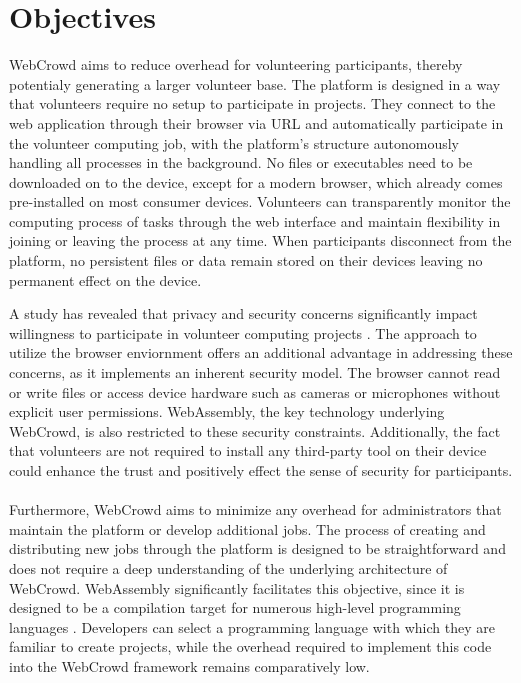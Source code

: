 \section{Objectives}
\label{sec:intro:objectives}
WebCrowd aims to reduce overhead for volunteering participants, thereby potentialy generating a larger volunteer base. The platform is designed in a way that volunteers require no setup to participate in projects. They connect to the web application through their browser via \acs{URL} and automatically participate in the volunteer computing job, with the platform's structure autonomously handling all processes in the background. No files or executables need to be downloaded on to the device, except for a modern browser, which already comes pre-installed on most consumer devices. Volunteers can transparently monitor the computing process of tasks through the web interface and maintain flexibility in joining or leaving the process at any time. When participants disconnect from the platform, no persistent files or data remain stored on their devices leaving no permanent effect on the device.

A study has revealed that privacy and security concerns significantly impact willingness to participate in volunteer computing projects \cite{intro:volunteerStudy}. The approach to utilize the browser enviornment offers an additional advantage in addressing these concerns, as it implements an inherent security model. The browser cannot read or write files or access device hardware such as cameras or microphones without explicit user permissions. WebAssembly, the key technology underlying WebCrowd, is also restricted to these security constraints. Additionally, the fact that volunteers are not required to install any third-party tool on their device could enhance the trust and positively effect the sense of security for participants.
\\~\\
Furthermore, WebCrowd aims to minimize any overhead for administrators that maintain the platform or develop additional jobs. The process of creating and distributing new jobs through the platform is designed to be straightforward and does not require a deep understanding of the underlying architecture of WebCrowd. WebAssembly significantly facilitates this objective, since it is designed to be a compilation target for numerous high-level programming languages \cite{methodology:wasm, methodology:wasmW3C, methodology:wasmdocu, relatedwork:wasmedgecomputing}. Developers can select a programming language with which they are familiar to create projects, while the overhead required to implement this code into the WebCrowd framework remains comparatively low. 

